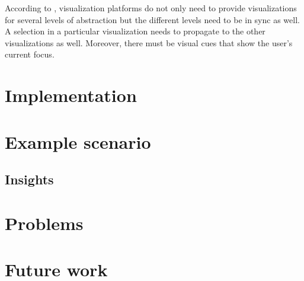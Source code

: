 \documentclass[journal]{vgtc}                %
\begin{document}
According to \cite{two}, visualization platforms do not only need to provide visualizations for several levels of abstraction but the different levels need to be in sync as well.
A selection in a particular visualization needs to propagate to the other visualizations as well.
Moreover, there must be visual cues that show the user's current focus.



\section{Implementation}

\section{Example scenario}
\subsection{Insights}

\section{Problems}

\section{Future work}
 



\end{document}
